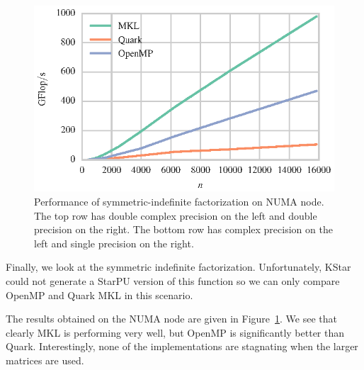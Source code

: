 \documentclass[a4paper,12pt]{article}
\begin{document}
\begin{figure}[t]
  \includegraphics[scale=.85]{fig/kebnekaise_ssytrf_weak_scaling.eps}
  \caption{Performance of symmetric-indefinite factorization on NUMA node.
    The top row has double complex precision on the left and double
    precision on the right.
    The bottom row has complex precision on the left and single
    precision on the right.}
  \label{fig.ldlt_numa}
\end{figure}

Finally,
we look at the symmetric indefinite factorization.
Unfortunately, KStar could not generate a StarPU version of this
function so we can only compare OpenMP and Quark
MKL in this scenario.

The results obtained on the NUMA node are given in
Figure~\ref{fig.ldlt_numa}.
We see that clearly MKL is performing very well,
but OpenMP is significantly better than Quark.
Interestingly,
none of the implementations are stagnating when the larger matrices
are used.
\end{document}

